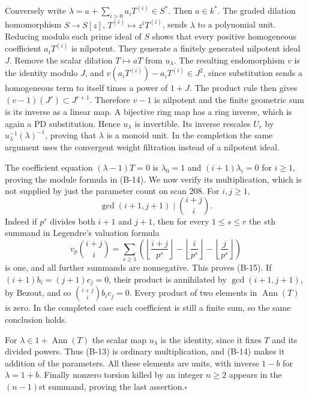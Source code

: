 Conversely write $\lambda=a+\sum_{i>0}a_iT^{(i)}\in S^*$.
Then $a\in k^*$. The graded dilation homomorphism
$S\to S[z]$, $T^{(i)}\mapsto z^iT^{(i)}$, sends $\lambda$ to
a polynomial unit. Reducing modulo each prime ideal of $S$ shows
that every positive homogeneous coefficient $a_iT^{(i)}$ is
nilpotent. They generate a finitely generated nilpotent ideal $J$.
Remove the scalar dilation $T\mapsto aT$ from $u_\lambda$.
The resulting endomorphism $v$ is the identity modulo $J$, and
$v(a_iT^{(i)})-a_iT^{(i)}\in J^2$, since substitution sends a
homogeneous term to itself times a power of $1+J$. The product rule
then gives $(v-1)(J^r)\subset J^{r+1}$. Therefore $v-1$ is
nilpotent and the finite geometric sum is its inverse as a linear
map. A bijective ring map has a ring inverse, which is again a
PD substitution. Hence $u_\lambda$ is invertible. Its inverse
rescales $U_r$ by $u_\lambda^{-1}(\lambda)^{-1}$, proving that
$\lambda$ is a monoid unit. In the completion the same argument
uses the convergent weight filtration instead of a nilpotent ideal.

The coefficient equation $(\lambda-1)T=0$ is
$\lambda_0=1$ and $(i+1)\lambda_i=0$ for $i\geq1$, proving the
module formula in (B-14). We now verify its multiplication, which
is not supplied by just the parameter count on scan 208.
For $i,j\geq1$,
\[
 \gcd(i+1,j+1)\mid\binom{i+j}{i}.
 \tag{B-15}
\]
Indeed if $p^r$ divides both $i+1$ and $j+1$, then for every
$1\leq s\leq r$ the $s$th summand in Legendre's valuation formula
\[
 v_p\binom{i+j}{i}
 =\sum_{s\geq1}\left(
 \left\lfloor\frac{i+j}{p^s}\right\rfloor-
 \left\lfloor\frac{i}{p^s}\right\rfloor-
 \left\lfloor\frac{j}{p^s}\right\rfloor\right)
\]
is one, and all further summands are nonnegative. This proves
(B-15). If $(i+1)b_i=(j+1)c_j=0$, their product is annihilated by
$\gcd(i+1,j+1)$, by Bezout, and so
$\binom{i+j}{i}b_ic_j=0$. Every product of two elements in
$\operatorname{Ann}(T)$ is zero. In the completed case each
coefficient is still a finite sum, so the same conclusion holds.

For $\lambda\in1+\operatorname{Ann}(T)$ the scalar map $u_\lambda$
is the identity, since it fixes $T$ and its divided powers.
Thus (B-13) is ordinary multiplication, and (B-14) makes it
addition of the parameters. All these elements are units, with
inverse $1-b$ for $\lambda=1+b$. Finally nonzero torsion killed
by an integer $n\geq2$ appears in the $(n-1)$st summand, proving
the last assertion.\hfill$\square$

